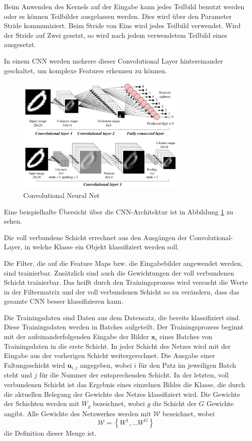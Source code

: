 Beim Anwenden des Kernels auf der Eingabe kann jedes Teilbild benutzt werden oder es können Teilbilder ausgelassen werden. Dies wird über den Parameter Stride kommuniziert. Beim Stride von Eins wird jedes Teilbild verwendet. Wird der Stride auf Zwei gesetzt, so wird nach jedem verwendetem Teilbild eines ausgesetzt.


In einem CNN werden mehrere dieser Convolutional Layer hintereinander geschaltet, um komplexe Features erkennen zu können. 
\begin{figure}[H]
  \centering
  \includegraphics[width=0.75\textwidth]{images/cnn.pdf}
  \caption{Convolutional Neural Net \cite{CNNImg}}
  \label{fig:cnn}
\end{figure}



Eine beispielhafte Übersicht über die CNN-Architektur ist in Abbildung \ref{fig:cnn} zu sehen.

Die voll verbundene Schicht errechnet aus den Ausgängen der Convolutional-Layer, in welche Klasse ein Objekt klassifiziert werden soll.

Die Filter, die auf die Feature Maps bzw. die Eingabebilder angewendet werden, sind trainierbar. Zusätzlich sind auch die Gewichtungen der voll verbundenen Schicht trainierbar. Das heißt durch den Trainingsprozess wird versucht die Werte in der Filtermatrix und der voll verbundenen Schicht so zu verändern, dass das gesamte CNN besser klassifizieren kann. 



Die Trainingsdaten sind Daten aus dem Datensatz, die bereits klassifiziert sind. Diese Trainingsdaten werden in Batches aufgeteilt. Der Trainingsprozess beginnt mit der aufeinanderfolgenden Eingabe der Bilder $\mathbf{x}_i$ eines Batches von Trainingsdaten in die erste Schicht. In jeder Schicht des Netzes wird mit der Eingabe aus der vorherigen Schicht weitergerechnet. Die Ausgabe einer Faltungsschicht wird $\mathbf{u}_{i,j}$ angegeben, wobei $i$ für den Patz im jeweiligen Batch steht und $j$ für die Nummer der entsprechenden Schicht. In der letzten, voll verbundenen Schicht ist das Ergebnis eines einzelnen Bildes die Klasse, die durch die aktuellen Belegung der Gewichte des Netzes klassifiziert wird. Die Gewichte der Schichten werden mit $W_{g}$ bezeichnet, wobei $g$ die Schicht der $G$ Gewichte angibt. Alle Gewichte des Netzwerkes werden mit $\mathcal{W}$ bezeichnet, wobei 
\begin{equation}
\mathcal{W}=\left\{ W^{1}, \ldots W^{G} \right\}
\end{equation}
die Definition dieser Menge ist.

